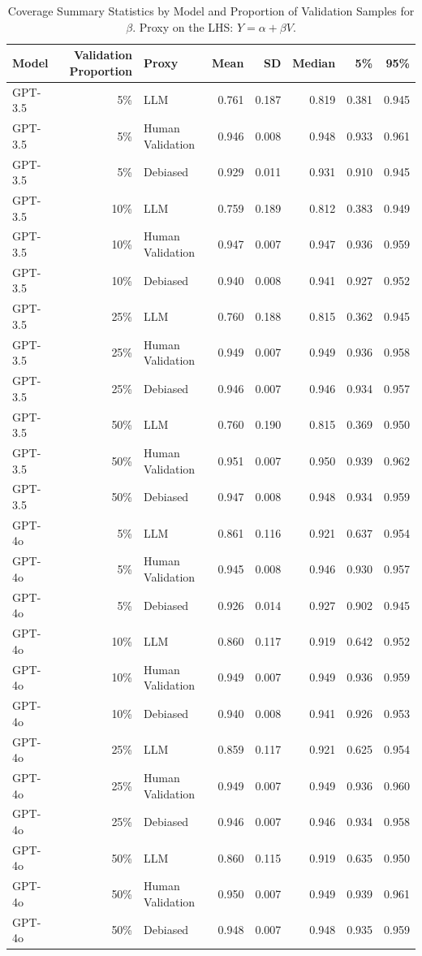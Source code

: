 \begin{table}

\caption{Coverage Summary Statistics by Model and Proportion of Validation Samples for $\beta$. Proxy on the LHS: $Y = \alpha + \beta V$.}
\centering
\begin{tabular}[t]{lrlrrrrr}
\toprule
Model & Validation Proportion & Proxy & Mean & SD & Median & 5\% & 95\%\\
\midrule
GPT-3.5 & 5\% & LLM & 0.761 & 0.187 & 0.819 & 0.381 & 0.945\\
GPT-3.5 & 5\% & Human Validation & 0.946 & 0.008 & 0.948 & 0.933 & 0.961\\
GPT-3.5 & 5\% & Debiased & 0.929 & 0.011 & 0.931 & 0.910 & 0.945\\
GPT-3.5 & 10\% & LLM & 0.759 & 0.189 & 0.812 & 0.383 & 0.949\\
GPT-3.5 & 10\% & Human Validation & 0.947 & 0.007 & 0.947 & 0.936 & 0.959\\
GPT-3.5 & 10\% & Debiased & 0.940 & 0.008 & 0.941 & 0.927 & 0.952\\
GPT-3.5 & 25\% & LLM & 0.760 & 0.188 & 0.815 & 0.362 & 0.945\\
GPT-3.5 & 25\% & Human Validation & 0.949 & 0.007 & 0.949 & 0.936 & 0.958\\
GPT-3.5 & 25\% & Debiased & 0.946 & 0.007 & 0.946 & 0.934 & 0.957\\
GPT-3.5 & 50\% & LLM & 0.760 & 0.190 & 0.815 & 0.369 & 0.950\\
GPT-3.5 & 50\% & Human Validation & 0.951 & 0.007 & 0.950 & 0.939 & 0.962\\
GPT-3.5 & 50\% & Debiased & 0.947 & 0.008 & 0.948 & 0.934 & 0.959\\
GPT-4o & 5\% & LLM & 0.861 & 0.116 & 0.921 & 0.637 & 0.954\\
GPT-4o & 5\% & Human Validation & 0.945 & 0.008 & 0.946 & 0.930 & 0.957\\
GPT-4o & 5\% & Debiased & 0.926 & 0.014 & 0.927 & 0.902 & 0.945\\
GPT-4o & 10\% & LLM & 0.860 & 0.117 & 0.919 & 0.642 & 0.952\\
GPT-4o & 10\% & Human Validation & 0.949 & 0.007 & 0.949 & 0.936 & 0.959\\
GPT-4o & 10\% & Debiased & 0.940 & 0.008 & 0.941 & 0.926 & 0.953\\
GPT-4o & 25\% & LLM & 0.859 & 0.117 & 0.921 & 0.625 & 0.954\\
GPT-4o & 25\% & Human Validation & 0.949 & 0.007 & 0.949 & 0.936 & 0.960\\
GPT-4o & 25\% & Debiased & 0.946 & 0.007 & 0.946 & 0.934 & 0.958\\
GPT-4o & 50\% & LLM & 0.860 & 0.115 & 0.919 & 0.635 & 0.950\\
GPT-4o & 50\% & Human Validation & 0.950 & 0.007 & 0.949 & 0.939 & 0.961\\
GPT-4o & 50\% & Debiased & 0.948 & 0.007 & 0.948 & 0.935 & 0.959\\
\bottomrule
\end{tabular}
\end{table}
